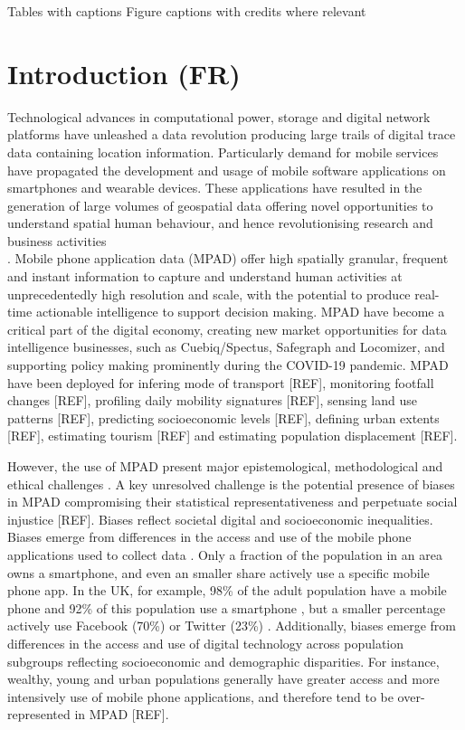 \documentclass[]{rsos}%
\begin{document}
Tables with captions Figure captions with credits where relevant

\newpage

\section{Introduction (FR)}\label{introduction-fr}

Technological advances in computational power, storage and digital
network platforms have unleashed a data revolution producing large
trails of digital trace data containing location information.
Particularly demand for mobile services have propagated the development and usage of mobile software applications on smartphones and wearable devices. These applications have resulted in the generation of large volumes of geospatial data offering novel
opportunities to understand spatial human behaviour, and hence revolutionising research and business activities\\
\citep{rowe23-bigdata}. Mobile phone application data (MPAD) offer high spatially granular, frequent and instant information to
capture and understand human activities at unprecedentedly high
resolution and scale, with the potential to produce real-time actionable intelligence
to support decision making. MPAD have become a critical part of the digital economy, creating new market opportunities for data intelligence businesses, such as Cuebiq/Spectus, Safegraph and Locomizer, and supporting policy making prominently during the COVID-19 pandemic.
MPAD have been deployed for infering mode of transport {[}REF{]}, monitoring footfall changes {[}REF{]},
profiling daily mobility signatures {[}REF{]}, sensing land use patterns {[}REF{]},
predicting socioeconomic levels {[}REF{]}, defining urban extents {[}REF{]}, estimating tourism {[}REF{]} and
estimating population displacement {[}REF{]}.

However, the use of MPAD present major epistemological,
methodological and ethical challenges \citep{rowe23-bigdata}. A key
unresolved challenge is the potential presence of biases in MPAD compromising their statistical representativeness and
perpetuate social injustice {[}REF{]}. Biases reflect societal digital and
socioeconomic inequalities. Biases emerge from differences in the access
and use of the mobile phone applications used to collect data \citep{wesolowski13-biases}. Only a fraction of
the population in an area owns a smartphone, and even an smaller share
actively use a specific mobile phone app. In the UK, for example, 98\% of
the adult population have a mobile phone and 92\% of this population use
a smartphone \citep{ofcom23}, but a smaller percentage actively use Facebook
(70\%) or Twitter (23\%) \citep{statista24}. Additionally, biases emerge from
differences in the access and use of digital technology across
population subgroups reflecting socioeconomic and demographic disparities.
For instance, wealthy, young and urban populations generally have greater access and more intensively use of mobile phone applications, and therefore tend to be over-represented in MPAD {[}REF{]}.
\end{document}

